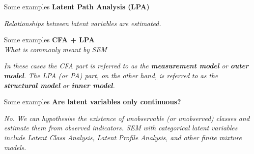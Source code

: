 \documentclass{beamer}
\begin{document}
\begin{frame}{Some examples}
    \centering
    \textbf{Latent Path Analysis (LPA)} \\
    \vspace{2em}
    \vspace{2em}
    \textit{Relationships between latent variables are estimated.}
\end{frame}

\begin{frame}{Some examples}
    \centering
    \textbf{CFA + LPA} \\
    \textit{What is commonly meant by SEM} \\
    \vspace{2em}
    \vspace{2em}
    \small
    \textit{In these cases the CFA part is referred to as the \textbf{measurement model} or \textbf{outer model}. The LPA (or PA) part, on the other hand, is referred to as the \textbf{structural model} or \textbf{inner model}.}
\end{frame}

\begin{frame}{Some examples}
    \centering
    \textbf{Are latent variables only continuous?} \\
    \vspace{2em}
    \vspace{2em}
    \textit{No. We can hypothesise the existence of unobservable (or unobserved) classes and estimate them from observed indicators. SEM with categorical latent variables include Latent Class Analysis, Latent Profile Analysis, and other finite mixture models.}
\end{frame}
\end{document}
